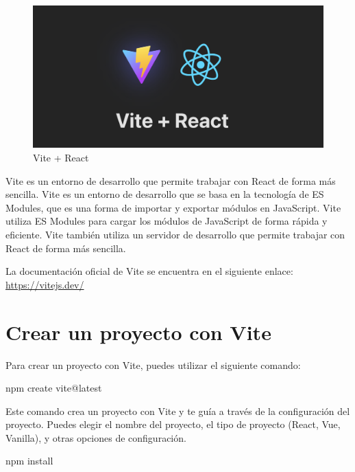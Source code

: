 \documentclass[
  a4paper,
  DIV=11,
  numbers=noendperiod,
  onepage,
  openany]{scrreprt}
\newenvironment{Shaded}{\begin{snugshade}}{\end{snugshade}}
\newcommand{\ExtensionTok}[1]{\textcolor[rgb]{0.00,0.23,0.31}{#1}}
\newcommand{\NormalTok}[1]{\textcolor[rgb]{0.00,0.23,0.31}{#1}}
\begin{document}
\begin{figure}[H]

{\centering \includegraphics{images/viteAndReact.png}

}

\caption{Vite + React}

\end{figure}%

Vite es un entorno de desarrollo que permite trabajar con React de forma
más sencilla. Vite es un entorno de desarrollo que se basa en la
tecnología de ES Modules, que es una forma de importar y exportar
módulos en JavaScript. Vite utiliza ES Modules para cargar los módulos
de JavaScript de forma rápida y eficiente. Vite también utiliza un
servidor de desarrollo que permite trabajar con React de forma más
sencilla.

La documentación oficial de Vite se encuentra en el siguiente enlace:
\url{https://vitejs.dev/}

\section{Crear un proyecto con Vite}\label{crear-un-proyecto-con-vite}

Para crear un proyecto con Vite, puedes utilizar el siguiente comando:

\begin{Shaded}
\begin{Highlighting}[]
\ExtensionTok{npm}\NormalTok{ create vite@latest}
\end{Highlighting}
\end{Shaded}

Este comando crea un proyecto con Vite y te guía a través de la
configuración del proyecto. Puedes elegir el nombre del proyecto, el
tipo de proyecto (React, Vue, Vanilla), y otras opciones de
configuración.

\begin{Shaded}
\begin{Highlighting}[]
\ExtensionTok{npm}\NormalTok{ install}
\end{Highlighting}
\end{Shaded}
\end{document}

